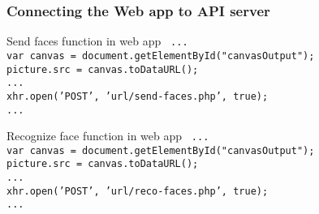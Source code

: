 \begin{frame} \frametitle{Connecting the Web app to API server}
	
	\vfill
	\begin{block} {Send faces function in web app}
		\texttt{
			...\\
	  		var canvas = document.getElementById("canvasOutput");\\
    	  		picture.src = canvas.toDataURL();\\
			...\\
	  		xhr.open('POST', 'url/send-faces.php', true);\\
			...
		}
	\end{block}
	\vfill
	\begin{block} {Recognize face function in web app}
		\texttt{
			...\\
			var canvas = document.getElementById("canvasOutput");\\
		    picture.src = canvas.toDataURL();\\
		    ...\\
		    xhr.open('POST', 'url/reco-faces.php', true);\\
		    ...		
		}
	\end{block}
	\vfill
\end{frame}